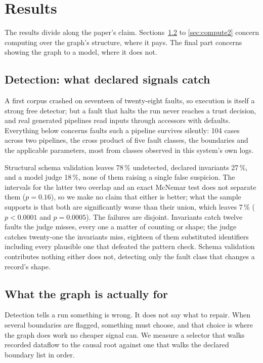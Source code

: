 \section{Results}
\label{sec:results}

The results divide along the paper's claim. Sections~\ref{sec:compute1} to
\ref{sec:compute2} concern computing over the graph's structure, where it pays. The final
part concerns showing the graph to a model, where it does not.

\subsection{Detection: what declared signals catch}

A first corpus crashed on seventeen of twenty-eight faults, so execution is itself a strong
free detector; but a fault that halts the run never reaches a trust decision, and real
generated pipelines read inputs through accessors with defaults. Everything below concerns
faults such a pipeline survives silently: 104 cases across two pipelines, the cross product
of five fault classes, the boundaries and the applicable parameters, most from classes
observed in this system's own logs.

Structural schema validation leaves 78\,\% undetected, declared invariants 27\,\%, and a
model judge 18\,\%, none of them raising a single false suspicion. The intervals for the
latter two overlap and an exact McNemar test does not separate them ($p=0.16$), so we make
no claim that either is better; what the sample supports is that both are significantly
worse than their union, which leaves 7\,\% ($p<0.0001$ and $p=0.0005$). The failures are
disjoint. Invariants catch twelve faults the judge misses, every one a matter of counting
or shape; the judge catches twenty-one the invariants miss, eighteen of them substituted
identifiers including every plausible one that defeated the pattern check. Schema
validation contributes nothing either does not, detecting only the fault class that
changes a record's shape.

\subsection{What the graph is actually for}
\label{sec:compute1}

Detection tells a run something is wrong. It does not say what to repair. When several
boundaries are flagged, something must choose, and that choice is where the graph does work
no cheaper signal can. We measure a selector that walks recorded dataflow to the causal
root against one that walks the declared boundary list in order.

